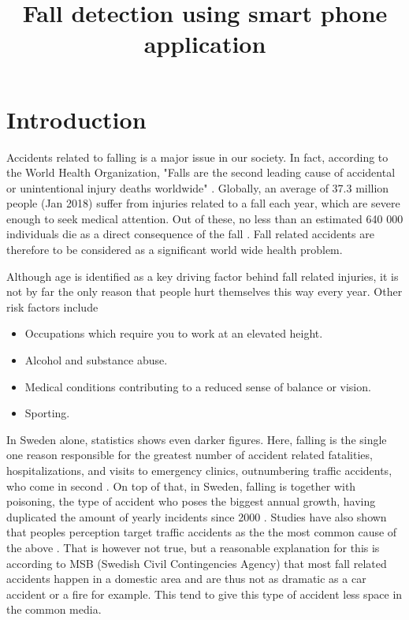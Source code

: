\documentclass[12pt, a4paper, onecolumn]{article}
\begin{document}
	
	\title{Fall detection using smart phone application}
	\maketitle

	\tableofcontents
	\newpage
	
	\section{Introduction}
	
	Accidents related to falling is a major issue in our society. In fact, according to the World Health Organization, "Falls are the second leading cause of accidental or unintentional injury deaths worldwide" \cite{who}. Globally, an average of 37.3 million people (Jan 2018) suffer from injuries related to a fall each year, which are severe enough to seek medical attention. Out of these, no less than an estimated 640 000 individuals die as a direct consequence of the fall \cite{who}. Fall  related accidents are therefore to be considered as a significant world wide health problem. 
	
	Although age is identified as a key driving factor behind fall related injuries, it is not by far the only reason that people hurt themselves this way every year.  Other risk factors include 
	\begin{itemize}
		\item Occupations which require you to work at an elevated height.
		\item Alcohol and substance abuse.
		\item Medical conditions contributing to a reduced sense of balance or vision.
		\item Sporting.	
	\end{itemize}
	
	In Sweden alone, statistics shows even darker figures. Here, falling is the single one reason responsible for the greatest number of accident related fatalities, hospitalizations, and visits to emergency clinics, outnumbering traffic accidents, who come in second \cite[p~3,5]{msb_report}. On top of that, in Sweden, falling is together with poisoning, the type of accident who poses the biggest annual growth, having duplicated the amount of yearly incidents since 2000 \cite{soc_olyckor}. Studies have also shown that peoples perception target traffic accidents as the the most common cause of the above \cite[p~5]{msb_report}. That is however not true, but a reasonable explanation for this is according to MSB (Swedish Civil Contingencies Agency) that most fall related accidents happen in a domestic area and are thus not as dramatic as a car accident or a fire for example. This tend to give this type of accident less space in the common media. 
	
\end{document}
